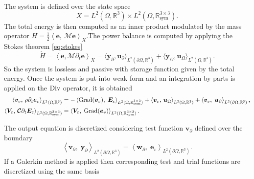 The system is defined over the state space
\[
X = L^2(\Omega, \mathbb{R}^3) \times L^2(\Omega, \mathbb{R}^{3\times 3}_{\text{sym}}).
\]
The total energy is then computed as an inner product modulated by the mass operator $H = \frac{1}{2} \left\langle \bm{e}, \ \bm{\mathcal{M}} \bm{e} \right\rangle_{X}$.The power balance is computed by applying the Stokes theorem \eqref{eq:stokes}
\begin{equation}
\label{eq:pow_eldyn}
\dot{H} = \left\langle \bm{e},  \mathcal{M} \partial_t \bm{e} \right\rangle_{X} = \langle \bm{y}_\partial,  \bm{u}_\partial \rangle_{L^2(\partial\Omega, \mathbb{R}^3)} + \langle \bm{y}_\Omega,  \bm{u}_\Omega \rangle_{L^2(\Omega, \mathbb{R}^3)}.
\end{equation}
So the system is lossless and passive with storage function given by the total energy. Once the system is put into weak form and an integration by parts is applied on the $\Div$ operator, it is obtained
\begin{equation}
\begin{aligned}
\inner[L^2(\Omega, \mathbb{R}^3)]{\bm{v}_v}{\rho \partial_t \bm{e}_v} &=- \left\langle {\Grad} (\bm{v}_v), \; \bm{E}_\varepsilon \right\rangle_{L^2(\Omega, \mathbb{R}^{3\times 3}_{\text{sym}})} + \inner[L^2(\Omega, \mathbb{R}^3)]{\bm{v}_v}{\bm{u}_\Omega}  + \left\langle \bm{v}_v, \; \bm{u}_\partial \right\rangle_{L^2(\partial \Omega, \mathbb{R}^3)}, \\
\inner[L^2(\Omega, \mathbb{R}^{3\times 3}_{\text{sym}})]{\bm{V}_\varepsilon}{\bm{\mathcal{C}}\partial_t \bm{E}_\varepsilon} &=\left\langle \bm{V}_\varepsilon, \; {\Grad} (\bm{e}_v) \right\rangle_{L^2(\Omega, \mathbb{R}^{3\times 3}_{\text{sym}})}.
\end{aligned}
\end{equation}

The output equation is discretized considering test function $\bm{v}_\partial$ defined over the boundary
\begin{equation}
\left\langle \bm{v}_\partial, \; \bm{y}_\partial \right\rangle_{L^2(\partial \Omega, \mathbb{R}^3)} = \left\langle \bm{w}_\partial, \; \bm{e}_v \right\rangle_{L^2(\partial \Omega, \mathbb{R}^3)}.
\end{equation}
If a Galerkin method is applied then corresponding test and trial functions are discretized using the same basis

